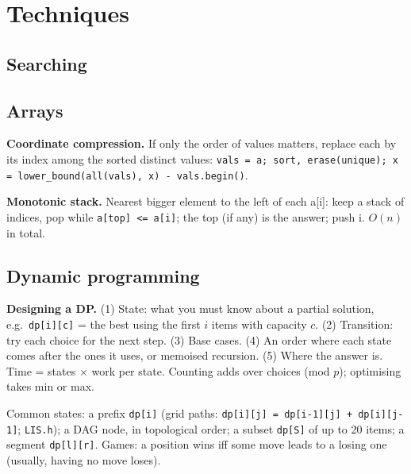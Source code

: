 \chapter{Techniques}

\section{Searching}

\section{Arrays}
	\textbf{Coordinate compression.} If only the order of values matters, replace each by its index among the
	sorted distinct values: \texttt{vals = a; sort, erase(unique); x = lower\_bound(all(vals), x) - vals.begin()}.

	\textbf{Monotonic stack.} Nearest bigger element to the left of each a[i]: keep a stack of indices, pop
	while \texttt{a[top] <= a[i]}; the top (if any) is the answer; push i. $O(n)$ in total.

\section{Dynamic programming}
	\textbf{Designing a DP.}
	(1) State: what you must know about a partial solution, e.g.\ \texttt{dp[i][c]} = the best using the
	first $i$ items with capacity $c$. (2) Transition: try each choice for the next step. (3) Base cases.
	(4) An order where each state comes after the ones it uses, or memoised recursion. (5) Where the answer is.
	Time = states $\times$ work per state. Counting adds over choices (mod $p$); optimising takes min or max.

	Common states: a prefix \texttt{dp[i]} (grid paths: \texttt{dp[i][j] = dp[i-1][j] + dp[i][j-1]}; \texttt{LIS.h});
	a DAG node, in topological order; a subset \texttt{dp[S]} of up to 20 items; a segment \texttt{dp[l][r]}.
	Games: a position wins iff some move leads to a losing one (usually, having no move loses).
